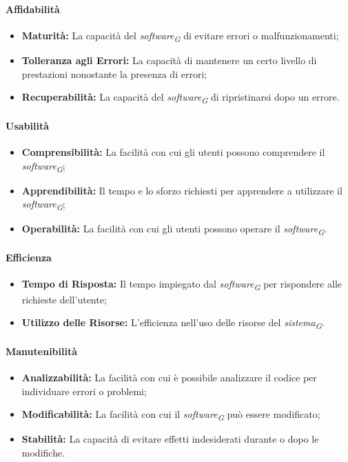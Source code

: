 \paragraph{Affidabilità}
\begin{itemize}
    \item \textbf{Maturità:} La capacità del \textit{software}\textsubscript{\textit{G}} di evitare errori o malfunzionamenti;
    \item \textbf{Tolleranza agli Errori:} La capacità di mantenere un certo livello di prestazioni nonostante la presenza di errori;
    \item \textbf{Recuperabilità:} La capacità del \textit{software}\textsubscript{\textit{G}} di ripristinarsi dopo un errore.
\end{itemize}

\paragraph{Usabilità}
\begin{itemize}
    \item \textbf{Comprensibilità:} La facilità con cui gli utenti possono comprendere il \textit{software}\textsubscript{\textit{G}};
    \item \textbf{Apprendibilità:} Il tempo e lo sforzo richiesti per apprendere a utilizzare il \textit{software}\textsubscript{\textit{G}};
    \item \textbf{Operabilità:} La facilità con cui gli utenti possono operare il \textit{software}\textsubscript{\textit{G}}.
\end{itemize}

\paragraph{Efficienza}
\begin{itemize}
    \item \textbf{Tempo di Risposta:} Il tempo impiegato dal \textit{software}\textsubscript{\textit{G}} per rispondere alle richieste dell'utente;
    \item \textbf{Utilizzo delle Risorse:} L'efficienza nell'uso delle risorse del \textit{sistema}\textsubscript{\textit{G}}.
\end{itemize}

\paragraph{Manutenibilità}
\begin{itemize}
    \item \textbf{Analizzabilità:} La facilità con cui è possibile analizzare il codice per individuare errori o problemi;
    \item \textbf{Modificabilità:} La facilità con cui il \textit{software}\textsubscript{\textit{G}} può essere modificato;
    \item \textbf{Stabilità:} La capacità di evitare effetti indesiderati durante o dopo le modifiche.
\end{itemize}

